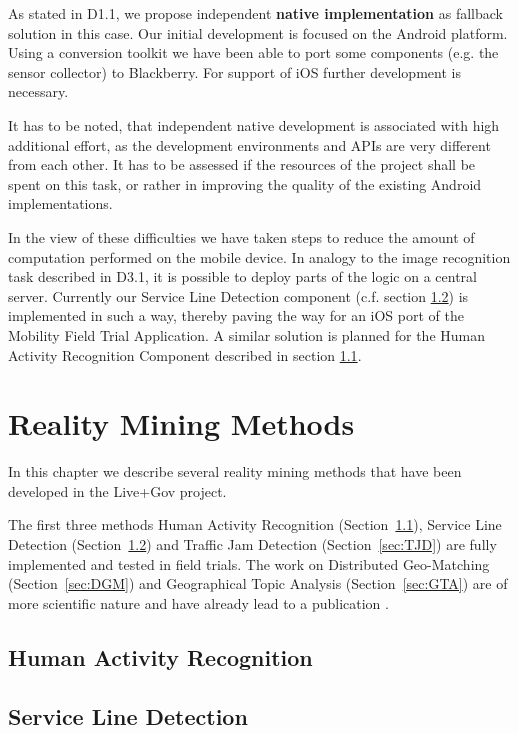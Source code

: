 \documentclass[external]{20120615_deliverable_template_ukob}
\theoremstyle{definition}
\begin{document}
As stated in D1.1, we propose independent {\bf native implementation}
as fallback solution in this case. Our initial development is focused
on the Android platform. Using a conversion toolkit we have been able
to port some components (e.g. the sensor collector) to Blackberry.
For support of iOS further development is necessary.

It has to be noted, that independent native development is associated
with high additional effort, as the development environments and APIs
are very different from each other. It has to be assessed if the
resources of the project shall be spent on this task, or rather in
improving the quality of the existing Android implementations.

In the view of these difficulties we have taken steps to reduce the
amount of computation performed on the mobile device. In analogy to
the image recognition task described in D3.1, it is possible to deploy
parts of the logic on a central server. Currently our Service Line
Detection component (c.f. section \ref{sec:SLD}) is implemented in
such a way, thereby paving the way for an iOS port of the Mobility
Field Trial Application. A similar solution is planned for the Human
Activity Recognition Component described in section \ref{sec:HAR}.


\clearpage
\chapter{Reality Mining Methods}

In this chapter we describe several reality mining methods that have
been developed in the Live+Gov project.

The first three methods Human Activity Recognition (Section~\ref{sec:HAR}),
Service Line Detection (Section~\ref{sec:SLD}) and Traffic Jam Detection
(Section~\ref{sec:TJD}) are fully implemented and tested in field trials.
The work on Distributed Geo-Matching (Section~\ref{sec:DGM}) and Geographical Topic
Analysis (Section~\ref{sec:GTA}) are of more scientific nature and have already
lead to a publication \cite{CCK1}.

\section{Human Activity Recognition}
\label{sec:HAR}


\clearpage
\section{Service Line Detection}
\label{sec:SLD}

\end{document}
